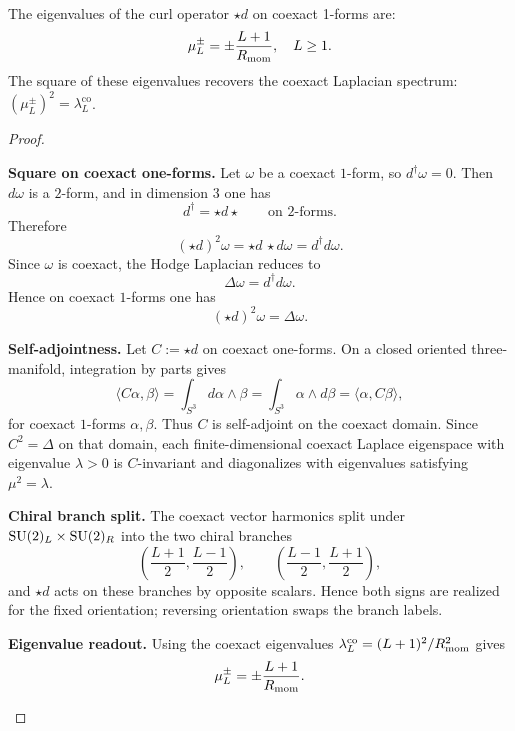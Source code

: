 \documentclass[11pt]{article}
\begin{document}
\begin{theorem}
\label{p1a:theorem:atlas-spectrum-of-curl-d9aaa10}

\mbox{}\\[6pt] 
The eigenvalues of the curl operator $\star d$ on coexact 1-forms are:
\[
\mu_L^\pm = \pm \frac{L+1}{R_{\mathrm{mom}}}, \quad L \geq 1.
\]
The square of these eigenvalues recovers the coexact Laplacian spectrum: $(\mu_L^\pm)^2 = \lambda_L^{\text{co}}$.
\cite{peraltaSalasSlobodeanu2020beltrami,ikedaTaniguchi1978eigenforms}
\end{theorem}
\begin{proof}

\begin{proofsteps}
\item \textbf{Square on coexact one-forms.}
Let $\omega$ be a coexact $1$-form, so $d^\dagger\omega=0$.
Then $d\omega$ is a $2$-form, and in dimension $3$ one has
\[
d^\dagger = \star d \star
\qquad\text{on $2$-forms.}
\]
Therefore
\[
(\star d)^2\omega
=
\star d\,\star d\omega
=
d^\dagger d\omega.
\]
Since $\omega$ is coexact, the Hodge Laplacian reduces to
\[
\Delta\omega=d^\dagger d\omega.
\]
Hence on coexact $1$-forms one has
\[
(\star d)^2\omega=\Delta\omega.
\]

\item \textbf{Self-adjointness.}
Let $C:=\star d$ on coexact one-forms.  On a closed oriented three-manifold, integration by parts gives
\[
\langle C\alpha,\beta\rangle=\int_{S^3} d\alpha\wedge\beta
=\int_{S^3}\alpha\wedge d\beta
=\langle \alpha,C\beta\rangle,
\]
for coexact $1$-forms $\alpha,\beta$.  Thus $C$ is self-adjoint on the coexact domain.  Since
$C^2=\Delta$ on that domain, each finite-dimensional coexact Laplace eigenspace with eigenvalue
$\lambda>0$ is $C$-invariant and diagonalizes with eigenvalues satisfying $\mu^2=\lambda$.

\item \textbf{Chiral branch split.}
The coexact vector harmonics split under $\mathrm{SU}(2)_L\times\mathrm{SU}(2)_R$ into the two chiral branches
\[
\left(\frac{L+1}{2},\frac{L-1}{2}\right),\qquad
\left(\frac{L-1}{2},\frac{L+1}{2}\right),
\]
and $\star d$ acts on these branches by opposite scalars. Hence both signs are realized for the fixed orientation; reversing orientation swaps the branch labels.

\item \textbf{Eigenvalue readout.}
Using the coexact eigenvalues $\lambda_L^{\mathrm{co}}=(L+1)^2/R_{\mathrm{mom}}^2$ gives
\[
\mu_L^\pm=\pm\frac{L+1}{R_{\mathrm{mom}}}.
\]
\end{proofsteps}
\end{proof}
\end{document}
